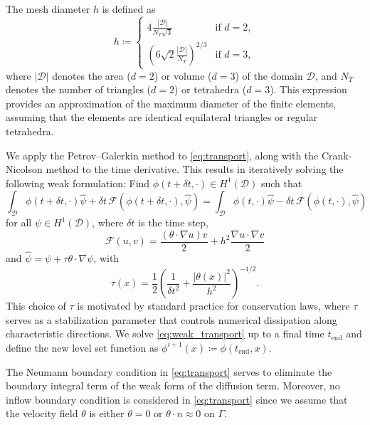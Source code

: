\documentclass[preprint,9pt]{elsarticle}
\begin{document}
The mesh diameter $h$ is defined as
\[
	h\coloneqq
	\begin{cases}
		4\frac{\left|\mathcal{D}\right|}{N_T\sqrt{3}}
			& \text{if } d = 2,\\
		\left(6\sqrt{2}\frac{\left|\mathcal{D}\right|}{N_T}\right)^{2/3}
			& \text{if } d = 3,
	\end{cases}
\]
where $\left|\mathcal{D}\right|$ denotes the area ($d=2$) or volume ($d=3$)
of the domain $\mathcal{D}$, and $N_T$ denotes the number of triangles ($d=2$) 
or tetrahedra ($d=3$).
This expression provides an approximation of
the maximum diameter of the finite elements,
assuming that the elements are identical equilateral triangles
or regular tetrahedra.

We apply the Petrov--Galerkin method \cite{MR1640142} to \eqref{eq:transport},
along with the Crank-Nicolson method to the time derivative.
This results in iteratively solving the following weak formulation:
Find $\phi(t+\delta t,\cdot)\in H^1(\mathcal{D})$ such that
\begin{equation}\label{eq:weak_transport}
	\int_{\mathcal{D}} \phi(t+\delta t,\cdot)\hat{\psi} +
		\delta t \, \mathcal{F}(\phi(t+\delta t,\cdot), \hat{\psi})
	= \int_{\mathcal{D}} \phi(t,\cdot) \hat{\psi} -
		\delta t \, \mathcal{F}(\phi(t,\cdot), \hat{\psi})	
\end{equation}
for all $\psi\in H^1(\mathcal{D})$, where $\delta t$ is the time step,
\[
	\mathcal{F}(u,v)=\frac{(\theta \cdot \nabla u) v}{2}
	+ h^2\frac{\nabla u \cdot \nabla v}{2}
\]
and $\hat{\psi}=\psi+\tau \theta\cdot\nabla\psi$, with 
\begin{equation}\label{eq:tau_lv}
	\tau(x) = \frac{1}{2}\left(\frac{1}{\delta t^2}
	+ \frac{|\theta(x)|^2}{h^2}\right)^{-1/2}.
\end{equation}
This choice of $\tau$ is motivated by standard practice for conservation laws,
where $\tau$ serves as a stabilization parameter that controls
numerical dissipation along characteristic directions.
We solve \eqref{eq:weak_transport} up to a final time $t_{\text{end}}$ and
define the new level set function as
$\phi^{i+1}(x)\coloneqq\phi(t_\text{end},x)$.

The Neumann boundary condition in \eqref{eq:transport} serves to eliminate
the boundary integral term of the weak form of the diffusion term.
Moreover, no inflow boundary condition is considered in \eqref{eq:transport}
since we assume that the velocity field $\theta$ is either $\theta = 0$ 
or $\theta \cdot n \approx 0$ on $\Gamma$.
\end{document}
